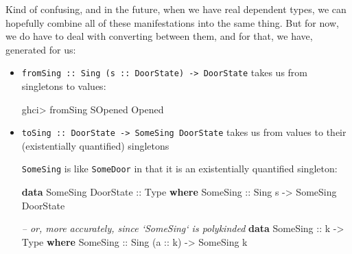 \documentclass[]{article}
\newenvironment{Shaded}{}{}
\newcommand{\KeywordTok}[1]{\textcolor[rgb]{0.00,0.44,0.13}{\textbf{#1}}}
\newcommand{\DataTypeTok}[1]{\textcolor[rgb]{0.56,0.13,0.00}{#1}}
\newcommand{\StringTok}[1]{\textcolor[rgb]{0.25,0.44,0.63}{#1}}
\newcommand{\CommentTok}[1]{\textcolor[rgb]{0.38,0.63,0.69}{\textit{#1}}}
\newcommand{\OtherTok}[1]{\textcolor[rgb]{0.00,0.44,0.13}{#1}}
\newcommand{\FunctionTok}[1]{\textcolor[rgb]{0.02,0.16,0.49}{#1}}
\newcommand{\NormalTok}[1]{#1}
\begin{document}
Kind of confusing, and in the future, when we have real dependent types, we can
hopefully combine all of these manifestations into the same thing. But for now,
we do have to deal with converting between them, and for that, we have,
generated for us:

\begin{itemize}
\item
  \texttt{fromSing\ ::\ Sing\ (s\ ::\ DoorState)\ -\textgreater{}\ DoorState}
  takes us from singletons to values:

\begin{Shaded}
\begin{Highlighting}[]
\NormalTok{ghci}\FunctionTok{>}\NormalTok{ fromSing }\DataTypeTok{SOpened}
\DataTypeTok{Opened}
\end{Highlighting}
\end{Shaded}
\item
  \texttt{toSing\ ::\ DoorState\ -\textgreater{}\ SomeSing\ DoorState} takes us
  from values to their (existentially quantified) singletons

\begin{Shaded}
\end{Shaded}

  \texttt{SomeSing} is like \texttt{SomeDoor} in that it is an existentially
  quantified singleton:

\begin{Shaded}
\begin{Highlighting}[]
\KeywordTok{data} \DataTypeTok{SomeSing} \DataTypeTok{DoorState}\OtherTok{ ::} \DataTypeTok{Type} \KeywordTok{where}
    \DataTypeTok{SomeSing}\OtherTok{ ::} \DataTypeTok{Sing}\NormalTok{ s }\OtherTok{->} \DataTypeTok{SomeSing} \DataTypeTok{DoorState}

\CommentTok{-- or, more accurately, since `SomeSing` is polykinded}
\KeywordTok{data} \DataTypeTok{SomeSing}\OtherTok{ ::}\NormalTok{ k }\OtherTok{->} \DataTypeTok{Type} \KeywordTok{where}
    \DataTypeTok{SomeSing}\OtherTok{ ::} \DataTypeTok{Sing}\NormalTok{ (}\OtherTok{a ::}\NormalTok{ k) }\OtherTok{->} \DataTypeTok{SomeSing}\NormalTok{ k}
\end{Highlighting}
\end{Shaded}
\end{itemize}
\end{document}
